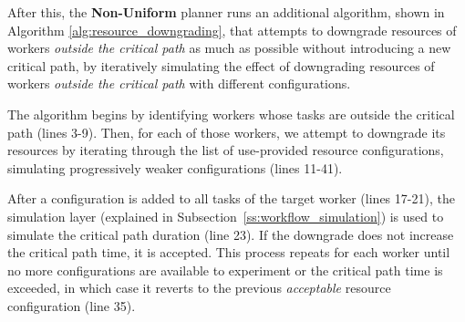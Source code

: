 After this, the \textbf{Non-Uniform} planner runs an additional algorithm, shown in Algorithm \ref{alg:resource_downgrading}, that attempts to downgrade resources of workers \textit{outside the critical path} as much as possible without introducing a new critical path, by iteratively simulating the effect of downgrading resources of workers \textit{outside the critical path} with different configurations.

The algorithm begins by identifying workers whose tasks are outside the critical path (lines 3-9). Then, for each of those workers, we attempt to downgrade its resources by iterating through the list of use-provided resource configurations, simulating progressively weaker configurations (lines 11-41). 

After a configuration is added to all tasks of the target worker (lines 17-21), the simulation layer (explained in Subsection~\ref{ss:workflow_simulation}) is used to simulate the critical path duration (line 23). If the downgrade does not increase the critical path time, it is accepted. This process repeats for each worker until no more configurations are available to experiment or the critical path time is exceeded, in which case it reverts to the previous \textit{acceptable} resource configuration (line 35).

